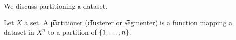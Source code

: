 

We discuss partitioning a dataset.


Let $X$ a set.
A \t{partitioner} (\t{clusterer} or \t{segmenter}) is a function mapping a dataset in $X^n$ to a partition of $\{1, \dots, n\}$.

\blankpage
